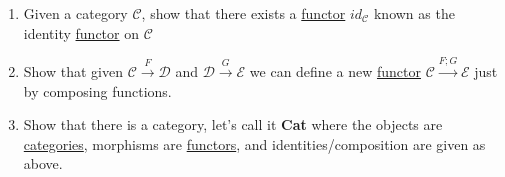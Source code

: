 \begin{enumerate}
    \item Given a category $\mathcal{C}$, show that there exists a \hyperref[D3.35]{functor} $id_\mathcal{C}$ known as the identity \hyperref[D3.35]{functor} on $\mathcal{C}$
    \item Show that given $\mathcal{C}\xrightarrow{F}\mathcal{D}$ and $\mathcal{D}\xrightarrow{G}\mathcal{E}$ we can define a new \hyperref[D3.35]{functor} $\mathcal{C}\xrightarrow{F;G}\mathcal{E}$ just by composing functions.
    \item Show that there is a category, let's call it \textbf{Cat} where the objects are \hyperref[D3.6]{categories}, morphisms are \hyperref[D3.35]{functors}, and identities/composition are given as above.

  \end{enumerate}